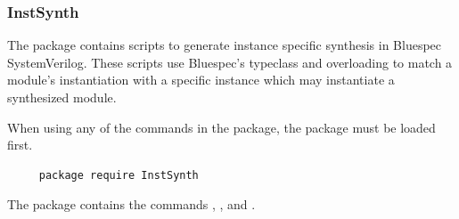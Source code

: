 
\subsubsection{InstSynth}
The  package contains scripts to generate instance
specific synthesis in Bluespec SystemVerilog.  These scripts use
Bluespec's typeclass and overloading to match a module's instantiation
with a specific instance which may instantiate a synthesized module.

When using any of the commands in the  package, the
package must be loaded first.

\begin{verbatim}
     package require InstSynth
\end{verbatim} 


The  package contains the commands 
, , and .








